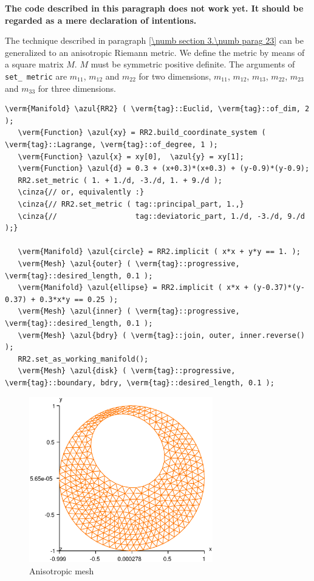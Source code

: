 {\normalfont\bfseries The code described in this paragraph does not work yet.
It should be regarded as a mere declaration of intentions.}
\medskip

The technique described in paragraph \ref{\numb section 3.\numb parag 23} can be generalized to
an anisotropic Riemann metric.
We define the metric by means of a square matrix $M$.
$M$ must be symmetric positive definite.
The arguments of {\small\tt set\_\,metric} are $ m_{11} $, $ m_{12} $ and $ m_{22} $
for two dimensions,
$ m_{11} $, $ m_{12} $, $ m_{13} $, $ m_{22} $, $ m_{23} $ and $ m_{33} $ for three dimensions.

\begin{Verbatim}[commandchars=\\\{\},formatcom=\small\tt,
   baselinestretch=0.94,framesep=2mm                     ]
   \verm{Manifold} \azul{RR2} ( \verm{tag}::Euclid, \verm{tag}::of_dim, 2 );
   \verm{Function} \azul{xy} = RR2.build_coordinate_system ( \verm{tag}::Lagrange, \verm{tag}::of_degree, 1 );
   \verm{Function} \azul{x} = xy[0],  \azul{y} = xy[1];
   \verm{Function} \azul{d} = 0.3 + (x+0.3)*(x+0.3) + (y-0.9)*(y-0.9);
   RR2.set_metric ( 1. + 1./d, -3./d, 1. + 9./d );
   \cinza{// or, equivalently :}
   \cinza{// RR2.set_metric ( tag::principal_part, 1.,}
   \cinza{//                  tag::deviatoric_part, 1./d, -3./d, 9./d );}

   \verm{Manifold} \azul{circle} = RR2.implicit ( x*x + y*y == 1. );
   \verm{Mesh} \azul{outer} ( \verm{tag}::progressive, \verm{tag}::desired_length, 0.1 );
   \verm{Manifold} \azul{ellipse} = RR2.implicit ( x*x + (y-0.37)*(y-0.37) + 0.3*x*y == 0.25 );
   \verm{Mesh} \azul{inner} ( \verm{tag}::progressive, \verm{tag}::desired_length, 0.1 );
   \verm{Mesh} \azul{bdry} ( \verm{tag}::join, outer, inner.reverse() );
   RR2.set_as_working_manifold();
   \verm{Mesh} \azul{disk} ( \verm{tag}::progressive, \verm{tag}::boundary, bdry, \verm{tag}::desired_length, 0.1 );
\end{Verbatim}

\begin{figure} \centering
 \includegraphics[width=80mm]{disk-anisotrop}
  \caption{Anisotropic mesh}
  \label{\numb section 3.\numb fig 11}
\end{figure}

